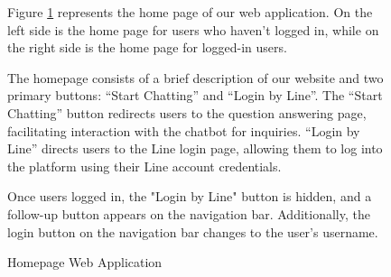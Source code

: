 \documentclass[12pt,oneside,openright,a4paper]{cpe-english-project}
\begin{document}
\begin{figure}[H]
            \caption{Homepage Web Application}\label{fig:WebAppHomepage}
            \begin{justify}
              \qquad Figure \ref{fig:WebAppHomepage} represents the home page of our web application. On the left side is the home page for users who  haven't logged in, while on the right side is the home page for logged-in users.\par
              \qquad The homepage consists of a brief description of our website and two primary buttons: “Start Chatting” and “Login by Line”.  The “Start Chatting” button redirects users to the question answering page, facilitating interaction with the chatbot for inquiries. “Login by Line” directs users to the Line login page, allowing them to log into the platform using their Line account credentials.\par
              \qquad Once users logged in, the  "Login by Line" button is hidden,  and a follow-up button appears on the navigation bar. Additionally, the login button on the navigation bar changes to the user's username.\par
            \end{justify}
          \end{figure}
\end{document}
